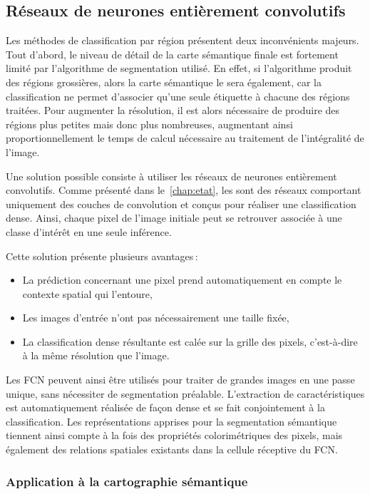 \subsection{Réseaux de neurones entièrement convolutifs}

Les méthodes de classification par région présentent deux inconvénients majeurs. Tout d'abord, le niveau de détail de la carte sémantique finale est fortement limité par l'algorithme de segmentation utilisé. En effet, si l'algorithme produit des régions grossières, alors la carte sémantique le sera également, car la classification ne permet d'associer qu'une seule étiquette à chacune des régions traitées. Pour augmenter la résolution, il est alors nécessaire de produire des régions plus petites mais donc plus nombreuses, augmentant ainsi proportionnellement le temps de calcul nécessaire au traitement de l'intégralité de l'image.

Une solution possible consiste à utiliser les réseaux de neurones entièrement convolutifs. Comme présenté dans le~\cref{chap:etat}, les  sont des réseaux comportant uniquement des couches de convolution et conçus pour réaliser une classification dense. Ainsi, chaque pixel de l'image initiale peut se retrouver associée à une classe d'intérêt en une seule inférence.

Cette solution présente plusieurs avantages\,:
\begin{itemize}
	\item La prédiction concernant une pixel prend automatiquement en compte le contexte spatial qui l'entoure,
	\item Les images d'entrée n'ont pas nécessairement une taille fixée,
	\item La classification dense résultante est calée sur la grille des pixels, c'est-à-dire à la même résolution que l'image.
\end{itemize}

Les \gls{FCN} peuvent ainsi être utilisés pour traiter de grandes images en une passe unique, sans nécessiter de segmentation préalable. L'extraction de caractéristiques est automatiquement réalisée de façon dense et se fait conjointement à la classification. Les représentations apprises pour la segmentation sémantique tiennent ainsi compte à la fois des propriétés colorimétriques des pixels, mais également des relations spatiales existants dans la cellule réceptive du \gls{FCN}.

\subsubsection{Application à la cartographie sémantique}

